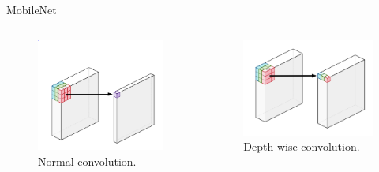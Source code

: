 \documentclass[12pt, dvipsnames]{beamer}
\begin{document}
\begin{frame}{MobileNet}
    \begin{columns}
        \begin{figure}
            \centering
            \includegraphics[width=1\textwidth]{resources/png/NormalConvolution.PNG}
            \caption{Normal convolution.\footnotemark}
        \end{figure}
        \begin{figure}
            \centering
            \includegraphics[width=1\textwidth]{resources/png/MobileNet.PNG}
            \caption{Depth-wise convolution.\footnotemark[2]}
        \end{figure}
    \end{columns}
\end{frame}
\end{document}
